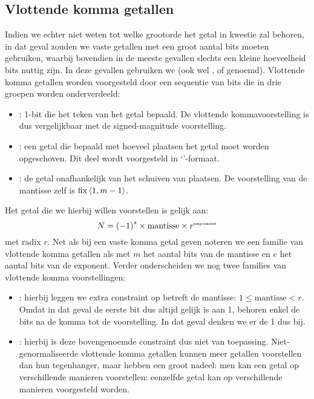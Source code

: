 \subsection{Vlottende komma getallen}
\label{ss:floatingPoints}
Indien we echter niet weten tot welke grootorde het getal in kwestie zal behoren, in dat geval zouden we vaste getallen met een groot aantal bits moeten gebruiken, waarbij bovendien in de meeste gevallen slechts een kleine hoeveelheid bits nuttig zijn. In deze gevallen gebruiken we  (ook wel ,  of  genoemd). Vlottende komma getallen worden voorgesteld door een sequentie van bits die in drie groepen worden onderverdeeld:
\begin{itemize}
 \item {}: 1-bit die het teken van het getal bepaald. De vlottende kommavoorstelling is dus vergelijkbaar met de signed-magnitude voorstelling.
 \item {}: een getal die bepaald met hoeveel plaatsen het getal moet worden opgeschoven. Dit deel wordt voorgesteld in `'-formaat.
 \item {}: de getal onafhankelijk van het schuiven van plaatsen. De voorstelling van de mantisse zelf is $\operatorname{fix}\left<1,m-1\right>$.
\end{itemize}
Het getal die we hierbij willen voorstellen is gelijk aan:
\begin{equation}
N=\left(-1\right)^s\times\mbox{mantisse}\times r^{\mbox{\tiny{exponent}}}
\end{equation}
met radix $r$. Net als bij een vaste komma getal geven noteren we een familie van vlottende komma getallen als  met $m$ het aantal bits van de mantisse en $e$ het aantal bits van de exponent. Verder onderscheiden we nog twee families van vlottende komma voorstellingen:
\begin{itemize}
 \item {}: hierbij leggen we extra constraint op betreft de mantisse: $1\leq\mbox{mantisse}<r$. Omdat in dat geval de eerste bit dus altijd gelijk is aan 1, behoren enkel de bits na de komma tot de voorstelling. In dat geval denken we er de 1 dus bij.
 \item {}: hierbij is deze bovengenoemde constraint dus niet van toepassing. Niet-genormaliseerde vlottende komma getallen kunnen meer getallen voorstellen dan hun tegenhanger, maar hebben een groot nadeel: men kan een getal op verschillende manieren voorstellen: eenzelfde getal kan op verschillende manieren voorgesteld worden.
\end{itemize}
